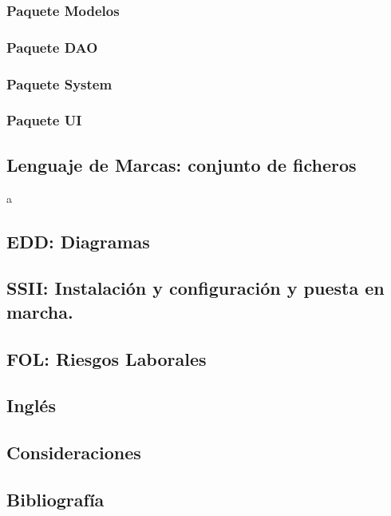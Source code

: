 \documentclass{article}
\begin{document}
\subsubsection{Paquete Modelos}

\subsubsection{Paquete DAO}

\subsubsection{Paquete System}

\subsubsection{Paquete UI}

\subsection{Lenguaje de Marcas: conjunto de ficheros}a

\subsection{EDD: Diagramas}
\subsection{SSII: Instalación y configuración y puesta en marcha.}
\subsection{FOL: Riesgos Laborales}
\subsection{Inglés}
\subsection{Consideraciones}
\subsection{Bibliografía}
\end{document}
